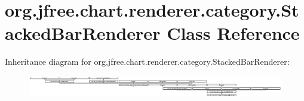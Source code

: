 \hypertarget{classorg_1_1jfree_1_1chart_1_1renderer_1_1category_1_1_stacked_bar_renderer}{}\section{org.\+jfree.\+chart.\+renderer.\+category.\+Stacked\+Bar\+Renderer Class Reference}
\label{classorg_1_1jfree_1_1chart_1_1renderer_1_1category_1_1_stacked_bar_renderer}
Inheritance diagram for org.\+jfree.\+chart.\+renderer.\+category.\+Stacked\+Bar\+Renderer\+:\begin{figure}[H]
\begin{center}
\leavevmode
\includegraphics[height=0.962199cm]{classorg_1_1jfree_1_1chart_1_1renderer_1_1category_1_1_stacked_bar_renderer}
\end{center}
\end{figure}
